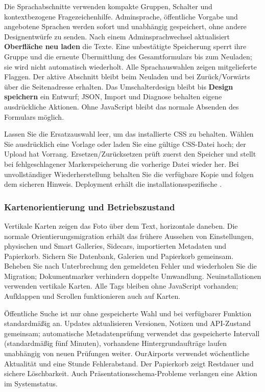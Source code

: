 \documentclass[11pt,a4paper]{article}
\newcommand{\filepath}[1]{\path{#1}}
\newcommand{\ui}[1]{\textbf{#1}}
\begin{document}
Die Sprachabschnitte verwenden kompakte Gruppen, Schalter und kontextbezogene
Fragezeichenhilfe. Adminsprache, öffentliche Vorgabe und angebotene Sprachen
werden sofort und unabhängig gespeichert, ohne andere Designentwürfe zu senden.
Nach einem Adminsprachwechsel aktualisiert \ui{Oberfläche neu laden} die Texte.
Eine unbestätigte Speicherung sperrt ihre Gruppe und die erneute Übermittlung
des Gesamtformulars bis zum Neuladen; sie wird nicht automatisch wiederholt.
Alle Sprachauswahlen zeigen mitgelieferte Flaggen. Der aktive Abschnitt bleibt
beim Neuladen und bei Zurück/Vorwärts über die Seitenadresse erhalten.
Das Umschalterdesign bleibt bis \ui{Design speichern} ein Entwurf; JSON, Import
und Diagnose behalten eigene ausdrückliche Aktionen. Ohne JavaScript bleibt
das normale Absenden des Formulars möglich.

Lassen Sie die Ersatzauswahl leer, um das installierte CSS zu behalten. Wählen
Sie ausdrücklich eine Vorlage oder laden Sie eine gültige CSS-Datei hoch; der
Upload hat Vorrang. Ersetzen/Zurücksetzen prüft zuerst den Speicher und stellt
bei fehlgeschlagener Markerspeicherung die vorherige Datei wieder her. Bei
unvollständiger Wiederherstellung behalten Sie die verfügbare Kopie und folgen
dem sicheren Hinweis. Deployment erhält die installationsspezifische
\filepath{public/assets/custom.css}.

\subsubsection{Kartenorientierung und Betriebszustand}
Vertikale Karten zeigen das Foto über dem Text, horizontale daneben. Die normale
Orientierungsmigration erhält das frühere Aussehen von Einstellungen, physischen
und Smart Galleries, Sidecars, importierten Metadaten und Papierkorb. Sichern
Sie Datenbank, Galerien und Papierkorb gemeinsam. Beheben Sie nach Unterbrechung
den gemeldeten Fehler und wiederholen Sie die Migration; Dokumentmarker
verhindern doppelte Umwandlung. Neuinstallationen verwenden vertikale Karten.
Alle Tags bleiben ohne JavaScript vorhanden; Aufklappen und Scrollen
funktionieren auch auf Karten.

Öffentliche Suche ist nur ohne gespeicherte Wahl und bei verfügbarer Funktion
standardmäßig an. Updates aktualisieren Versionen, Notizen und API-Zustand
gemeinsam; automatische Metadatenprüfung verwendet das gespeicherte Intervall
(standardmäßig fünf Minuten), vorhandene Hintergrundaufträge laufen unabhängig
von neuen Prüfungen weiter. OurAirports verwendet wöchentliche Aktualität und
eine Stunde Fehlerabstand. Der Papierkorb zeigt Restdauer und sichere
Löschbarkeit. Auch Präsentationsschema-Probleme verlangen eine Aktion im
Systemstatus.
\end{document}
